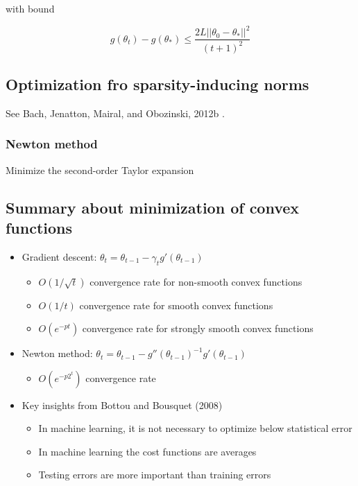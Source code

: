 \documentclass[b5paper]{report}
\begin{document}
with bound

\begin{equation}
  g(\theta_t) - g(\theta_*) \le \frac{2L ||\theta_0 - \theta_*||^2}{(t+1)^2}
\end{equation}

\subsection{Optimization fro sparsity-inducing norms}

See Bach, Jenatton, Mairal, and Obozinski, 2012b \cite{bach2012optimization}.

\subsubsection{Newton method}

Minimize the  second-order Taylor expansion


\subsection{Summary about minimization of convex functions}

\begin{itemize}
  \item Gradient descent: $\theta_t = \theta_{t-1}- \gamma_t g'(\theta_{t-1})$
    \begin{itemize}
      \item $O(1/\sqrt{t})$ convergence rate for non-smooth convex functions
      \item $O(1/t)$ convergence rate for smooth convex functions
      \item $O(e^{-pt})$ convergence rate for strongly smooth convex functions
    \end{itemize}
  \item Newton method: $\theta_t = \theta_{t-1}- g''(\theta_{t-1})^{-1}g'(\theta_{t-1})$
    \begin{itemize}
      \item $O(e^{-p2^t})$ convergence rate
    \end{itemize}
  \item Key insights from Bottou and Bousquet (2008)
    \begin{itemize}
      \item In machine learning, it is not necessary to optimize below
        statistical error
      \item In machine learning the cost functions are averages
      \item Testing errors are more important than training errors
    \end{itemize}
\end{itemize}
\end{document}
